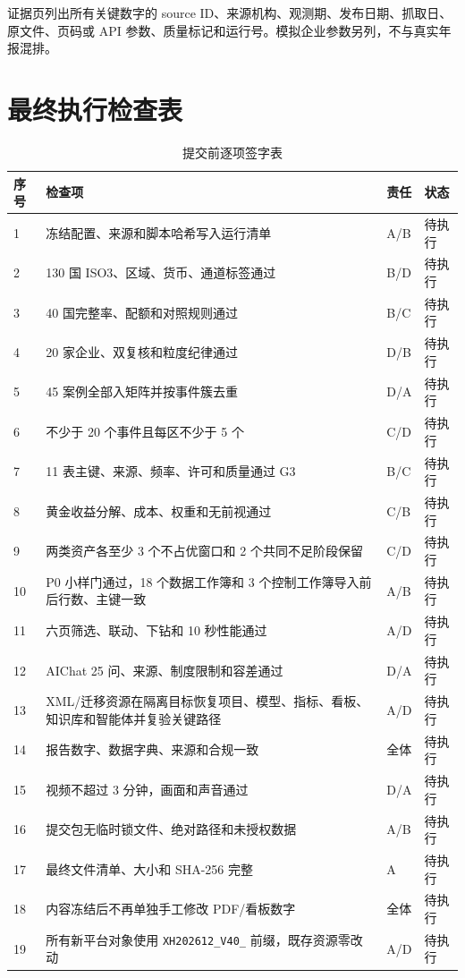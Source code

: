 \documentclass[UTF8,fontset=windows,12pt,openany]{ctexbook}
\newcommand{\Field}[1]{{\small\nolinkurl{#1}}}
\begin{document}
证据页列出所有关键数字的 source ID、来源机构、观测期、发布日期、抓取日、原文件、页码或 API 参数、质量标记和运行号。模拟企业参数另列，不与真实年报混排。

\chapter{最终执行检查表}

\begin{longtable}{p{1.4cm}p{9.1cm}p{1.8cm}p{1.8cm}}
\caption{提交前逐项签字表}\label{tab:final-signoff}\\
\toprule
\textbf{序号} & \textbf{检查项} & \textbf{责任} & \textbf{状态}\\
\midrule
1 & 冻结配置、来源和脚本哈希写入运行清单 & A/B & 待执行\\
2 & 130 国 ISO3、区域、货币、通道标签通过 & B/D & 待执行\\
3 & 40 国完整率、配额和对照规则通过 & B/C & 待执行\\
4 & 20 家企业、双复核和粒度纪律通过 & D/B & 待执行\\
5 & 45 案例全部入矩阵并按事件簇去重 & D/A & 待执行\\
6 & 不少于 20 个事件且每区不少于 5 个 & C/D & 待执行\\
7 & 11 表主键、来源、频率、许可和质量通过 G3 & B/C & 待执行\\
8 & 黄金收益分解、成本、权重和无前视通过 & C/B & 待执行\\
9 & 两类资产各至少 3 个不占优窗口和 2 个共同不足阶段保留 & C/D & 待执行\\
10 & P0 小样门通过，18 个数据工作簿和 3 个控制工作簿导入前后行数、主键一致 & A/B & 待执行\\
11 & 六页筛选、联动、下钻和 10 秒性能通过 & A/D & 待执行\\
12 & AIChat 25 问、来源、制度限制和容差通过 & D/A & 待执行\\
13 & XML/迁移资源在隔离目标恢复项目、模型、指标、看板、知识库和智能体并复验关键路径 & A/D & 待执行\\
14 & 报告数字、数据字典、来源和合规一致 & 全体 & 待执行\\
15 & 视频不超过 3 分钟，画面和声音通过 & D/A & 待执行\\
16 & 提交包无临时锁文件、绝对路径和未授权数据 & A/B & 待执行\\
17 & 最终文件清单、大小和 SHA-256 完整 & A & 待执行\\
18 & 内容冻结后不再单独手工修改 PDF/看板数字 & 全体 & 待执行\\
19 & 所有新平台对象使用 \Field{XH202612_V40_} 前缀，既存资源零改动 & A/D & 待执行\\

\end{longtable}
\end{document}
